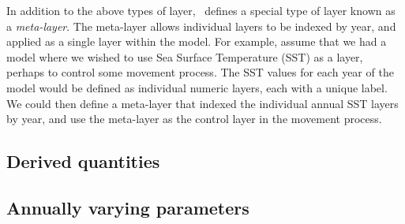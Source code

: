 In addition to the above types of layer, \SPM\ defines a special type of layer known as a \emph{meta-layer}. The meta-layer allows individual layers to be indexed by year, and applied as a single layer within the model. For example, assume that we had a model where we wished to use Sea Surface Temperature (SST) as a layer, perhaps to control some movement process. The SST values for each year of the model would be defined as individual numeric layers, each with a unique label. We could then define a meta-layer that indexed the individual annual SST layers by year, and use the meta-layer as the control layer in the movement process. 

\subsection{Derived quantities}

\subsection{Annually varying parameters}

